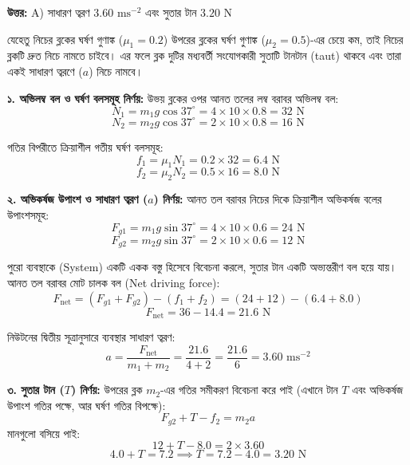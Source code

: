 \documentclass[12pt, a4paper]{article}
\begin{document}
{\vspace{0.5em}
\begin{tcolorbox}[answerbox]
\textbf{\color{success} উত্তর:} A) সাধারণ ত্বরণ $3.60\text{ ms}^{-2}$ এবং সুতার টান $3.20\text{ N}$
\end{tcolorbox}
\vspace{1em}

\begin{tcolorbox}[solutionbox={সমাধান (Solution)}]
\noindent
যেহেতু নিচের ব্লকের ঘর্ষণ গুণাঙ্ক ($\mu_1 = 0.2$) উপরের ব্লকের ঘর্ষণ গুণাঙ্ক ($\mu_2 = 0.5$)-এর চেয়ে কম, তাই নিচের ব্লকটি দ্রুত নিচে নামতে চাইবে। এর ফলে ব্লক দুটির মধ্যবর্তী সংযোগকারী সুতাটি টানটান (taut) থাকবে এবং তারা একই সাধারণ ত্বরণে ($a$) নিচে নামবে।

\vspace{0.5em}
\textbf{১. অভিলম্ব বল ও ঘর্ষণ বলসমূহ নির্ণয়:}
উভয় ব্লকের ওপর আনত তলের লম্ব বরাবর অভিলম্ব বল:
$$N_1 = m_1 g \cos 37^\circ = 4 \times 10 \times 0.8 = 32\text{ N}$$
$$N_2 = m_2 g \cos 37^\circ = 2 \times 10 \times 0.8 = 16\text{ N}$$

গতির বিপরীতে ক্রিয়াশীল গতীয় ঘর্ষণ বলসমূহ:
$$f_1 = \mu_1 N_1 = 0.2 \times 32 = 6.4\text{ N}$$
$$f_2 = \mu_2 N_2 = 0.5 \times 16 = 8.0\text{ N}$$

\vspace{0.5em}
\textbf{২. অভিকর্ষজ উপাংশ ও সাধারণ ত্বরণ ($a$) নির্ণয়:}
আনত তল বরাবর নিচের দিকে ক্রিয়াশীল অভিকর্ষজ বলের উপাংশসমূহ:
$$F_{g1} = m_1 g \sin 37^\circ = 4 \times 10 \times 0.6 = 24\text{ N}$$
$$F_{g2} = m_2 g \sin 37^\circ = 2 \times 10 \times 0.6 = 12\text{ N}$$

পুরো ব্যবস্থাকে (System) একটি একক বস্তু হিসেবে বিবেচনা করলে, সুতার টান একটি অভ্যন্তরীণ বল হয়ে যায়। আনত তল বরাবর মোট চালক বল (Net driving force):
$$F_{\text{net}} = (F_{g1} + F_{g2}) - (f_1 + f_2) = (24 + 12) - (6.4 + 8.0)$$
$$F_{\text{net}} = 36 - 14.4 = 21.6\text{ N}$$

নিউটনের দ্বিতীয় সূত্রানুসারে ব্যবস্থার সাধারণ ত্বরণ:
$$a = \frac{F_{\text{net}}}{m_1 + m_2} = \frac{21.6}{4 + 2} = \frac{21.6}{6} = 3.60\text{ ms}^{-2}$$

\vspace{0.5em}
\textbf{৩. সুতার টান ($T$) নির্ণয়:}
উপরের ব্লক $m_2$-এর গতির সমীকরণ বিবেচনা করে পাই (এখানে টান $T$ এবং অভিকর্ষজ উপাংশ গতির পক্ষে, আর ঘর্ষণ গতির বিপক্ষে):
$$F_{g2} + T - f_2 = m_2 a$$
মানগুলো বসিয়ে পাই:
$$12 + T - 8.0 = 2 \times 3.60$$
$$4.0 + T = 7.2 \implies T = 7.2 - 4.0 = 3.20\text{ N}$$


\end{tcolorbox}}
\end{document}

